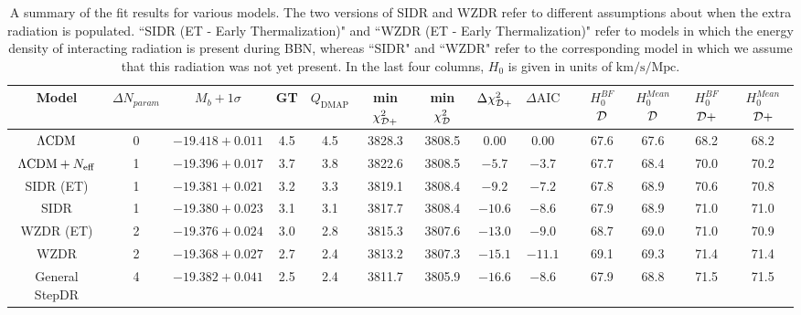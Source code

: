 \documentclass[aps,prd,twocolumn,nofootinbib,superscriptaddress]{revtex4}
\newcommand{\D}{\cal{D}}
\newcommand{\ksm}{\text{km} / \text{s} / \text{Mpc}}
\newcommand{\QDMAP}{Q_\text{DMAP}}
\def\lcdm{$\Lambda{\rm CDM}$}
\newcommand{\Neff}{N_{\rm eff}}
\begin{document}
\begin{table*}[h!]
	\centering
	\hspace*{-1.5cm}
	\begin{tabular}{|c || c | c | c | c|c|c | c|c| c | c | c | c | c |} 
		\hline
		Model& $\Delta N_{param}$& $M_b + 1 \sigma$ & GT & $\QDMAP$
		& min $\chi^2_{\D+}$& min $\chi^2_{\D}$& $\Delta \chi^2_{{\cal D+}}$ &  $\Delta \text{AIC}$& &  $H_0^{BF}$ $\D$
		&  $H_0^{Mean}$ $\D$&  $H_0^{BF}$ ${\cal D+}$&  $H_0^{Mean}$ ${\cal D+}$ \\
		\hline\hline
		\lcdm & 0& $-19.418 + 0.011$ & 4.5& 4.5& 3828.3& 3808.5& 0.00& 0.00& & 67.6& 67.6& 68.2& 68.2\\
		$\Lambda \text{CDM} + \Neff$& 1& $-19.396 + 0.017$ & 3.7& 3.8& 3822.6& 3808.5& $-5.7$ & $-3.7$ & & 67.7& 68.4& 70.0& 70.2\\
		SIDR (ET) & 1& $-19.381 + 0.021$ & 3.2& 3.3& 3819.1& 3808.4& $-9.2$ & $-7.2$ & & 67.8& 68.9& 70.6& 70.8\\
		SIDR & 1& $-19.380 + 0.023$ & 3.1& 3.1& 3817.7& 3808.4& $-10.6$ & $-8.6$ & & 67.9& 68.9& 71.0& 71.0\\
		WZDR (ET) & 2& $-19.376+ 0.024$ & 3.0& 2.8& 3815.3& 3807.6& $-13.0$ & $-9.0$ & & 68.7& 69.0& 71.0& 70.9 \\
		WZDR& 2& $-19.368 + 0.027$ & 2.7& 2.4& 3813.2& 3807.3& $-15.1$ & $-11.1$ & & 69.1& 69.3& 71.4& 71.4\\
		General StepDR & 4& $-19.382 + 0.041$ & 2.5& 2.4& 3811.7& 3805.9& $-16.6$ & $-8.6$ & & 67.9& 68.8& 71.5& 71.5\\
		\hline
	\end{tabular}
	\hspace*{-1.5cm}
	\caption{A summary of the fit results for various models. The two versions of SIDR and WZDR refer to different assumptions about when the extra radiation is populated. ``SIDR (ET - Early Thermalization)" and ``WZDR (ET - Early Thermalization)" refer to models in which the energy density of interacting radiation is present during BBN, whereas ``SIDR" and ``WZDR" refer to the corresponding model in which we assume that this radiation was not yet present.  In the last four columns, $H_0$ is given in units of $\ksm$.}
	\label{tb:fitresults}
\end{table*}    
\end{document}
